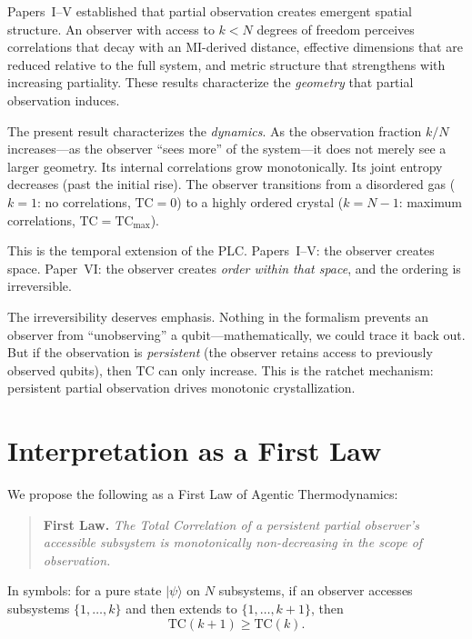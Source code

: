 \documentclass[aps,pra,twocolumn,superscriptaddress,floatfix]{revtex4-2}
\begin{document}
Papers~I--V established that partial observation creates emergent spatial structure.
An observer with access to $k < N$ degrees of freedom perceives correlations that decay with an MI-derived distance, effective dimensions that are reduced relative to the full system, and metric structure that strengthens with increasing partiality.
These results characterize the \emph{geometry} that partial observation induces.

The present result characterizes the \emph{dynamics}.
As the observation fraction $k/N$ increases---as the observer ``sees more'' of the system---it does not merely see a larger geometry.
Its internal correlations grow monotonically.
Its joint entropy decreases (past the initial rise).
The observer transitions from a disordered gas ($k = 1$: no correlations, $\mathrm{TC} = 0$) to a highly ordered crystal ($k = N-1$: maximum correlations, $\mathrm{TC} = \mathrm{TC}_{\mathrm{max}}$).

This is the temporal extension of the PLC.
Papers~I--V: the observer creates space.
Paper~VI: the observer creates \emph{order within that space}, and the ordering is irreversible.

The irreversibility deserves emphasis.
Nothing in the formalism prevents an observer from ``unobserving'' a qubit---mathematically, we could trace it back out.
But if the observation is \emph{persistent} (the observer retains access to previously observed qubits), then $\mathrm{TC}$ can only increase.
This is the ratchet mechanism: persistent partial observation drives monotonic crystallization.


\section{Interpretation as a First Law}
\label{sec:first_law}

We propose the following as a First Law of Agentic Thermodynamics:

\begin{quote}
\textbf{First Law.} \emph{The Total Correlation of a persistent partial observer's accessible subsystem is monotonically non-decreasing in the scope of observation.}
\end{quote}

In symbols: for a pure state $|\psi\rangle$ on $N$ subsystems, if an observer accesses subsystems $\{1, \ldots, k\}$ and then extends to $\{1, \ldots, k+1\}$, then
\begin{equation}
\mathrm{TC}(k+1) \geq \mathrm{TC}(k).
\label{eq:first_law}
\end{equation}
\end{document}

